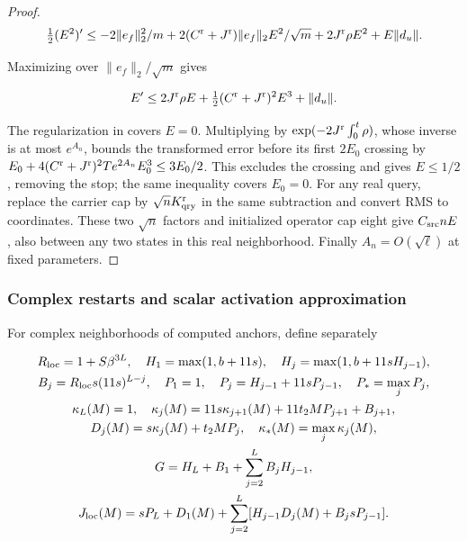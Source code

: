\begin{proof}
\[
\tfrac12(E^2)'
\le-2\|e_f\|_2^2/m
 +2(C^{\rm r}+J^{\rm r})\|e_f\|_2E^2/\sqrt m
 +2J^{\rm r}\rho E^2+E\|d_u\|.
\]

Maximizing over $\|e_f\|_2/\sqrt m$ gives

\begin{equation}
\label{cp:init:eq:signed-defect}
E'\le2J^{\rm r}\rho E+\tfrac12(C^{\rm r}+J^{\rm r})^2E^3+\|d_u\|.
\end{equation}

The regularization in  covers $E=0$.
Multiplying by $\exp(-2J^{\rm r}\int_0^t\rho)$, whose inverse is
at most $e^{A_n}$, bounds the transformed error before its first
$2E_0$ crossing by
$E_0+4(C^{\rm r}+J^{\rm r})^2Te^{2A_n}E_0^3\le3E_0/2$.
This excludes the crossing and gives $E\le1/2$, removing the stop;
the same inequality covers $E_0=0$.
For any real query, replace the carrier cap by
$\sqrt nK_{\rm qry}^{\rm r}$ in the same subtraction and convert
RMS to coordinates. These two $\sqrt n$ factors and initialized
operator cap eight give $C_{\rm src}nE$, also between any two
states in this real neighborhood. Finally $A_n=O(\sqrt\ell)$
at fixed parameters.
\end{proof}

\subsubsection{Complex restarts and scalar activation approximation}
\label{cp:init:sec:activation}

For complex neighborhoods of computed anchors, define separately

\begin{equation}
\label{cp:init:eq:complex-constants}
\begin{gathered}
R_{\rm loc}=1+S\beta^{3L},\quad
H_1=\max(1,b+11s),\quad H_j=\max(1,b+11sH_{j-1}),\\
B_j=R_{\rm loc}s(11s)^{L-j},\quad
P_1=1,\quad P_j=H_{j-1}+11sP_{j-1},\quad P_*=\max_jP_j,\\
\kappa_L(M)=1,\quad
\kappa_j(M)=11s\kappa_{j+1}(M)+11t_2MP_{j+1}+B_{j+1},\\
D_j(M)=s\kappa_j(M)+t_2MP_j,\quad \kappa_*(M)=\max_j\kappa_j(M),\\
G=H_L+B_1+\sum_{j=2}^LB_jH_{j-1},\\
J_{\rm loc}(M)=sP_L+D_1(M)
  +\sum_{j=2}^L[H_{j-1}D_j(M)+B_jsP_{j-1}].
\end{gathered}
\end{equation}

